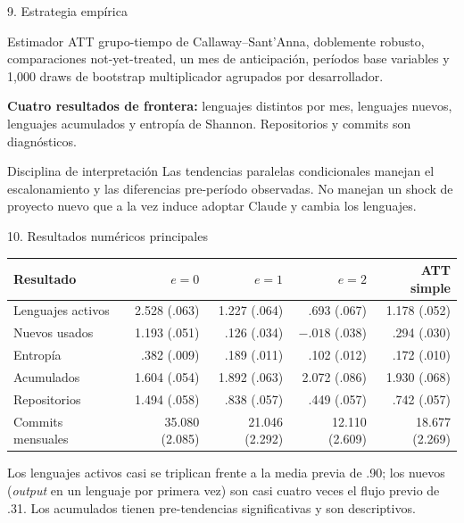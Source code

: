 \documentclass[aspectratio=169,10pt]{beamer}
\begin{document}
\begin{frame}{9. Estrategia empírica}
\begin{block}{Estimador}
ATT grupo-tiempo de Callaway--Sant'Anna, doblemente robusto, comparaciones not-yet-treated, un mes de anticipación, períodos base variables y 1,000 draws de bootstrap multiplicador agrupados por desarrollador.
\end{block}
\textbf{Cuatro resultados de frontera:} lenguajes distintos por mes, lenguajes nuevos, lenguajes acumulados y entropía de Shannon. Repositorios y commits son diagnósticos.
\vspace{.6em}
\begin{alertblock}{Disciplina de interpretación}
Las tendencias paralelas condicionales manejan el escalonamiento y las diferencias pre-período observadas. No manejan un shock de proyecto nuevo que a la vez induce adoptar Claude y cambia los lenguajes.
\end{alertblock}
\end{frame}

\begin{frame}{10. Resultados numéricos principales}
\begin{center}\scriptsize
\begin{tabular}{lrrrr}
\toprule Resultado & $e=0$ & $e=1$ & $e=2$ & ATT simple \\
\midrule
Lenguajes activos & 2.528 (.063) & 1.227 (.064) & .693 (.067) & 1.178 (.052) \\
Nuevos usados & 1.193 (.051) & .126 (.034) & $-.018$ (.038) & .294 (.030) \\
Entropía & .382 (.009) & .189 (.011) & .102 (.012) & .172 (.010) \\
Acumulados & 1.604 (.054) & 1.892 (.063) & 2.072 (.086) & 1.930 (.068) \\
Repositorios & 1.494 (.058) & .838 (.057) & .449 (.057) & .742 (.057) \\
Commits mensuales & 35.080 (2.085) & 21.046 (2.292) & 12.110 (2.609) & 18.677 (2.269) \\
\bottomrule
\end{tabular}
\end{center}
\vspace{.3em}
{\small Los lenguajes activos casi se triplican frente a la media previa de .90; los nuevos (\emph{output} en un lenguaje por primera vez) son casi cuatro veces el flujo previo de .31. Los acumulados tienen pre-tendencias significativas y son descriptivos.}
\end{frame}
\end{document}
